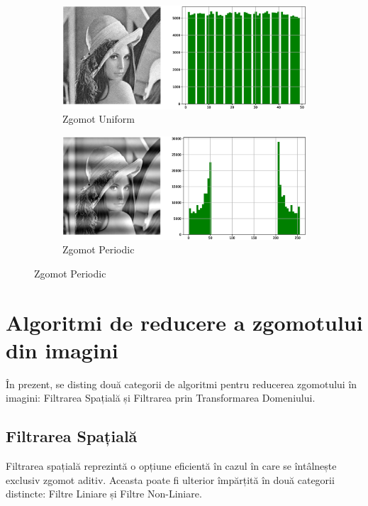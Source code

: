 \documentclass[12pt]{article}
\begin{document}
\begin{figure}[h!]
    \begin{subfigure}{0.49\textwidth}
        \centering
        \includegraphics[width=\textwidth]{images/Uniform_plot.eps}
        \caption{Zgomot Uniform}
        \label{fig:img10}
    \end{subfigure}
	\hspace{10pt} 
    \begin{subfigure}{0.49\textwidth}
        \centering
        \includegraphics[width=\textwidth]{images/Periodic_plot.eps}
        \caption{Zgomot Periodic}
        \label{fig:img11}
    \end{subfigure}
\end{figure}

\newpage




\section{Algoritmi de reducere a zgomotului din imagini}
\label{sec:algoritmi}

În prezent, se disting două categorii de algoritmi pentru reducerea zgomotului în imagini: Filtrarea Spațială și Filtrarea prin Transformarea Domeniului.\\


\subsection{Filtrarea Spațială}
Filtrarea spațială reprezintă o opțiune eficientă în cazul în care se întâlnește exclusiv zgomot aditiv. Aceasta poate fi ulterior împărțită în două categorii distincte: Filtre Liniare și Filtre Non-Liniare.\\
\end{document}
